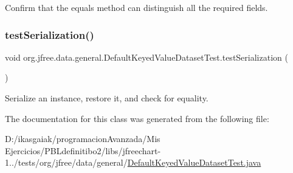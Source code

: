 Confirm that the equals method can distinguish all the required fields. \mbox{\label{classorg_1_1jfree_1_1data_1_1general_1_1_default_keyed_value_dataset_test_a304131996108454c3ae1ab7767dfa770}} 
\subsubsection{\texorpdfstring{test\+Serialization()}{testSerialization()}}
{\footnotesize\ttfamily void org.\+jfree.\+data.\+general.\+Default\+Keyed\+Value\+Dataset\+Test.\+test\+Serialization (\begin{DoxyParamCaption}{ }\end{DoxyParamCaption})}

Serialize an instance, restore it, and check for equality. 

The documentation for this class was generated from the following file\+:\begin{DoxyCompactItemize}
\item 
D\+:/ikasgaiak/programacion\+Avanzada/\+Mis Ejercicios/\+P\+B\+Ldefinitibo2/libs/jfreechart-\/1../tests/org/jfree/data/general/\mbox{\hyperlink{_default_keyed_value_dataset_test_8java}{Default\+Keyed\+Value\+Dataset\+Test.\+java}}\end{DoxyCompactItemize}

